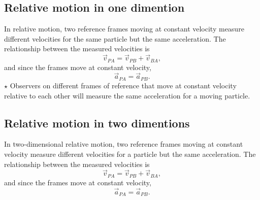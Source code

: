 \subsection{Relative motion in one dimention}
In relative motion, two reference frames moving at constant velocity measure different velocities for the same particle but the same acceleration. The relationship between the measured velocities is
\[
\vec{v}_{PA} = \vec{v}_{PB} + \vec{v}_{BA},
\]
and since the frames move at constant velocity,
\[
\vec{a}_{PA} = \vec{a}_{PB}.
\]
$\star$ Observers on different frames of reference that move at constant velocity relative to each other will measure the same acceleration for a moving particle.

\subsection{Relative motion in two dimentions}
In two-dimensional relative motion, two reference frames moving at constant velocity measure different velocities for a particle but the same acceleration. The relationship between the measured velocities is
\[
\vec{v}_{PA} = \vec{v}_{PB} + \vec{v}_{BA},
\]
and since the frames move at constant velocity,
\[
\vec{a}_{PA} = \vec{a}_{PB}.
\]